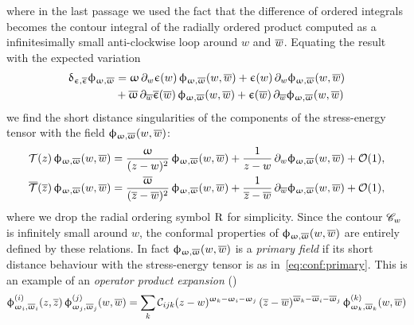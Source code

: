where in the last passage we used the fact that the difference of ordered integrals becomes the contour integral of the radially ordered product computed as a infinitesimally small anti-clockwise loop around $w$ and $\overline{w}$.
Equating the result with the expected variation
\begin{equation}
  \begin{split}
    \updelta_{\upepsilon, \overline{\upepsilon}} \upphi_{\upomega, \overline{\upomega}}
    & =
    \upomega\, \partial_{w} \upepsilon( w )\, \upphi_{\upomega, \overline{\upomega}}\qty( w, \overline{w} )
    +
    \upepsilon( w )\, \partial_{w} \upphi_{\upomega, \overline{\upomega}}\qty( w, \overline{w} )
    \\
    & +
    \overline{\upomega}\, \partial_{\overline{w}} \overline{\upepsilon}( \overline{w} )\, \upphi_{\upomega, \overline{\upomega}}\qty( w, \overline{w} )
    +
    \upepsilon( \overline{w} )\, \partial_{\overline{w}} \upphi_{\upomega, \overline{\upomega}}\qty( w, \overline{w} )
  \end{split}
\end{equation}
we find the short distance singularities of the components of the stress-energy tensor with the field $\upphi_{\upomega, \overline{\upomega}}( w, \overline{w} )$:
\begin{equation}
  \begin{split}
    \cT( z )\, \phi_{\omega, \bomega}\qty( w, \barw )
    & =
    \frac{\omega}{(z - w)^2}\, \phi_{\omega, \bomega}\qty( w, \barw )
    +
    \frac{1}{z - w}\, \ipd{w} \phi_{\omega, \bomega}\qty( w, \barw )
    +
    \order{1},
    \\
    \overline{\cT}( \barz )\, \phi_{\omega, \bomega}\qty( w, \barw )
    & =
    \frac{\bomega}{(\barz - \barw)^2}\, \phi_{\omega, \bomega}\qty( w, \barw )
    +
    \frac{1}{\barz - \barw}\, \ipd{\barw} \phi_{\omega, \bomega}\qty( w, \barw )
    +
    \order{1},
  \end{split}
  \label{eq:conf:primary}
\end{equation}
where we drop the radial ordering symbol $\mathrm{R}$ for simplicity.
Since the contour $\mathscr{C}_{w}$ is infinitely small around $w$, the conformal properties of $\upphi_{\upomega, \overline{\upomega}}( w, \overline{w} )$ are entirely defined by these relations.
In fact $\upphi_{\upomega, \overline{\upomega}}( w, \overline{w} )$ is a \emph{primary field} if its short distance behaviour with the stress-energy tensor is as in~\eqref{eq:conf:primary}.
This is an example of an \emph{operator product expansion} (\ope)
\begin{equation}
  \upphi^{(i)}_{\upomega_i, \overline{\upomega}_i}( z, \overline{z} )\, \upphi^{(j)}_{\upomega_j, \overline{\upomega}_j}( w, \overline{w} )
  =
  \sum\limits_{k}
  \mathcal{C}_{ijk}
  (z - w)^{\upomega_k - \upomega_i - \upomega_j}\,
  (\overline{z} - \overline{w})^{\overline{\upomega}_k - \overline{\upomega}_i - \overline{\upomega}_j}\,
  \upphi^{(k)}_{\upomega_k, \overline{\upomega}_k}( w, \overline{w} )
  \label{eq:conf:ope}
\end{equation}
